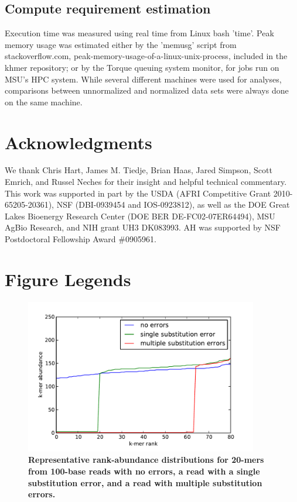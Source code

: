 \documentclass[10pt]{article}
\begin{document}
\subsection*{Compute requirement estimation}

Execution time was measured using real time from Linux bash 'time'.
Peak memory usage was estimated either by the 'memusg' script from
stackoverflow.com, peak-memory-usage-of-a-linux-unix-process, included
in the khmer repository; or by the Torque queuing system monitor, for
jobs run on MSU's HPC system.  While several different machines were
used for analyses, comparisons between unnormalized and normalized
data sets were always done on the same machine.

\section*{Acknowledgments}

We thank Chris Hart, James M. Tiedje, Brian Haas, Jared Simpson, Scott
Emrich, and Russel Neches for their insight and helpful technical
commentary.  This work was supported in part by the USDA (AFRI
Competitive Grant 2010-65205-20361), NSF (DBI-0939454 and
IOS-0923812), as well as the DOE Great Lakes Bioenergy Research Center
(DOE BER DE-FC02-07ER64494), MSU AgBio Research, and NIH grant UH3
DK083993.  AH was supported by NSF Postdoctoral Fellowship Award
\#0905961.



\newpage

\section*{Figure Legends}

\begin{figure}
\centerline{\includegraphics[width=4in]{diginorm-ranks.pdf}}
\caption{
{\bf Representative rank-abundance distributions for 20-mers from 100-base reads with no errors,
a read with a single substitution error, and a read with multiple
substitution errors.}}
\label{fig:rankabund}
\end{figure}
\end{document}
